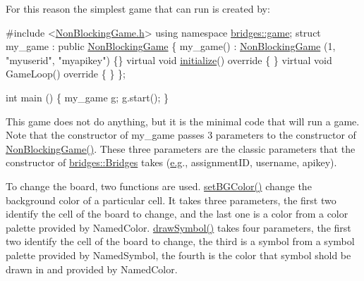 For this reason the simplest game that can run is created by\+:


\begin{DoxyCode}
\textcolor{preprocessor}{#include <\hyperlink{_non_blocking_game_8h}{NonBlockingGame.h}>}
\textcolor{keyword}{using namespace }\hyperlink{namespacebridges_1_1game}{bridges::game};
\textcolor{keyword}{struct }my\_game : \textcolor{keyword}{public} \hyperlink{classbridges_1_1game_1_1_non_blocking_game}{NonBlockingGame} \{
  my\_game() : \hyperlink{classbridges_1_1game_1_1_non_blocking_game}{NonBlockingGame} (1, \textcolor{stringliteral}{"myuserid"},  \textcolor{stringliteral}{"myapikey"}) \{\}
  \textcolor{keyword}{virtual} \textcolor{keywordtype}{void} \hyperlink{classbridges_1_1game_1_1_game_base_a9b6eb6fa7fceaac09d204b549164037f}{initialize}()\textcolor{keyword}{ override }\{ \}
  \textcolor{keyword}{virtual} \textcolor{keywordtype}{void} GameLoop()\textcolor{keyword}{ override }\{ \}
\};

\textcolor{keywordtype}{int} main () \{
  my\_game \hyperlink{namespacebridges_1_1game_ab9a19c7ab6e2ebac2f95180e21733487ab2f5ff47436671b6e533d8dc3614845d}{g};
  g.start();
\}
\end{DoxyCode}


This game does not do anything, but it is the minimal code that will run a game. Note that the constructor of my\+\_\+game passes 3 parameters to the constructor of \hyperlink{classbridges_1_1game_1_1_non_blocking_game_a3226aa7e7ff129e916f4bd5aabcb2e72}{Non\+Blocking\+Game()}. These three parameters are the classic parameters that the constructor of \hyperlink{classbridges_1_1_bridges}{bridges\+::\+Bridges} takes (\hyperlink{namespacebridges_1_1game_ab9a19c7ab6e2ebac2f95180e21733487ab2f5ff47436671b6e533d8dc3614845d}{e.\+g}., assignment\+ID, username, apikey).

To change the board, two functions are used. \hyperlink{classbridges_1_1game_1_1_game_base_ab667bbca1c81e5fb3aa8d81d70fe8cd2}{set\+B\+G\+Color()} change the background color of a particular cell. It takes three parameters, the first two identify the cell of the board to change, and the last one is a color from a color palette provided by Named\+Color. \hyperlink{classbridges_1_1game_1_1_game_base_a415fa8f70bef364dfa966f2a86048901}{draw\+Symbol()} takes four parameters, the first two identify the cell of the board to change, the third is a symbol from a symbol palette provided by Named\+Symbol, the fourth is the color that symbol shold be drawn in and provided by Named\+Color.

